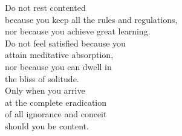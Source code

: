 Do not rest contented\\
because you keep all the rules and regulations,\\
nor because you achieve great learning.\\
Do not feel satisfied because you\\
attain meditative absorption,\\
nor because you can dwell in\\
the bliss of solitude.\\
Only when you arrive\\
at the complete eradication\\
of all ignorance and conceit\\
should you be content.

